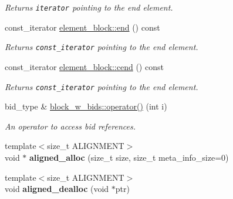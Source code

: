 \begin{CompactItemize}
\begin{CompactList}\small\item\em Returns {\tt iterator} pointing to the end element. \item\end{CompactList}\item 
\hypertarget{group__mnglayer_g75cecec83bf923364d5144e53d10a1ff}{
const\_\-iterator \hyperlink{group__mnglayer_g75cecec83bf923364d5144e53d10a1ff}{element\_\-block::end} () const }
\label{group__mnglayer_g75cecec83bf923364d5144e53d10a1ff}

\begin{CompactList}\small\item\em Returns {\tt const\_\-iterator} pointing to the end element. \item\end{CompactList}\item 
\hypertarget{group__mnglayer_g792762a9693c0dcc3ff53d316fa8d9d9}{
const\_\-iterator \hyperlink{group__mnglayer_g792762a9693c0dcc3ff53d316fa8d9d9}{element\_\-block::cend} () const }
\label{group__mnglayer_g792762a9693c0dcc3ff53d316fa8d9d9}

\begin{CompactList}\small\item\em Returns {\tt const\_\-iterator} pointing to the end element. \item\end{CompactList}\item 
\hypertarget{group__mnglayer_gf8ec031f551ea91964414679972173fd}{
bid\_\-type \& \hyperlink{group__mnglayer_gf8ec031f551ea91964414679972173fd}{block\_\-w\_\-bids::operator()} (int i)}
\label{group__mnglayer_gf8ec031f551ea91964414679972173fd}

\begin{CompactList}\small\item\em An operator to access bid references. \item\end{CompactList}\item 
\hypertarget{group__mnglayer_g8d476a01db346b846c34d297941ff6f0}{
{\footnotesize template$<$size\_\-t ALIGNMENT$>$ }\\void $\ast$ \textbf{aligned\_\-alloc} (size\_\-t size, size\_\-t meta\_\-info\_\-size=0)}
\label{group__mnglayer_g8d476a01db346b846c34d297941ff6f0}

\item 
\hypertarget{group__mnglayer_gb777ff7ae3e0a622f8b8f6cf04c37d33}{
{\footnotesize template$<$size\_\-t ALIGNMENT$>$ }\\void \textbf{aligned\_\-dealloc} (void $\ast$ptr)}
\label{group__mnglayer_gb777ff7ae3e0a622f8b8f6cf04c37d33}


\end{CompactItemize}

